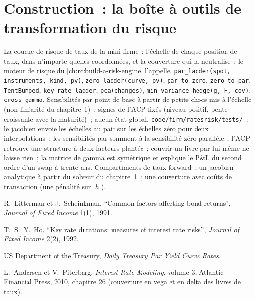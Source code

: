 \section{Construction~: la boîte à outils de transformation du risque}\label{bld:rc:rates-risk:ratesrisk}

\begin{build}
 La couche de risque de taux de la mini-firme~: l'échelle de chaque
position de taux, dans n'importe quelles coordonnées, et la couverture qui la
neutralise~; le moteur de risque du \cref{ch:rc:build-a-risk-engine} l'appelle.
 \texttt{par\_ladder(spot, instruments, kind, pv)},
\texttt{zero\_ladder(curve, pv)}, \texttt{par\_to\_zero}, \texttt{zero\_to\_par},
\texttt{TentBumped}, \texttt{key\_rate\_ladder}, \texttt{pca(changes)},
\texttt{min\_variance\_hedge(g, H, cov)}, \texttt{cross\_gamma}.
 Sensibilités par point de base à partir de petits chocs mis à
l'échelle (non-linéarité du chapitre~1)~; signes de l'ACP fixés (niveau positif,
pente croissante avec la maturité)~; aucun état global.
 \texttt{code/firm/ratesrisk/tests/}~: le jacobien
envoie les échelles au pair sur les échelles zéro pour deux interpolations~; les sensibilités par 
somment à la sensibilité zéro parallèle~; l'ACP retrouve une structure à deux facteurs
plantée~; couvrir un livre par lui-même ne laisse rien~; la matrice de gamma est
symétrique et explique le P\&L du second ordre d'un swap à trente ans.
 Compartiments de taux forward~; un jacobien
analytique à partir du solveur du chapitre~1~; une couverture avec coûts de transaction (une pénalité sur $|h|$).
\end{build}

\begin{omsources}
\item R.\ Litterman et J.\ Scheinkman, ``Common factors affecting bond
returns'', \emph{Journal of Fixed Income} 1(1), 1991.
\item T.\ S.\ Y.\ Ho, ``Key rate durations: measures of interest rate risks'',
\emph{Journal of Fixed Income} 2(2), 1992.
\item US Department of the Treasury, \emph{Daily Treasury Par Yield Curve Rates}.
\item L.\ Andersen et V.\ Piterbarg, \emph{Interest Rate Modeling}, volume 3,
Atlantic Financial Press, 2010, chapitre 26 (couverture en vega et en delta des livres de taux).
\end{omsources}

